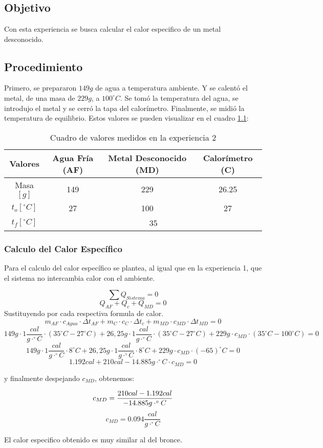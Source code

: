 \documentclass[12pt]{report}
\begin{document}
\chapter{}
\section{Objetivo}
Con esta experiencia se busca calcular el calor especifico de un metal desconocido.

\section{Procedimiento}
Primero, se prepararon $149 g$ de agua a temperatura ambiente. Y se calentó el metal, de una masa de $229 g$, a $100^\circ C$. Se tomó la temperatura del agua, se introdujo el metal y se cerró la tapa del calorímetro. Finalmente, se midió la temperatura de equilibrio.
Estos valores se pueden visualizar en el cuadro \ref{table:data}:

\begin{table}[htpb!]
\centering
\begin{tabular}{|c|c|c|c|}
    \hline
    Valores & Agua Fría (AF) & Metal Desconocido (MD)  & Calorímetro (C)\\
    \hline
    Masa$[g]$ & 149 & 229 & 26.25 \\
    \hline
    $t_o [^\circ C]$ & 27 & 100 & 27 \\
    \hline
    $t_f [^\circ C]$ & \multicolumn{3}{|c|}{35}\\
    \hline
\end{tabular}
\caption{Cuadro de valores medidos en la experiencia 2}
\label{table:data}
\end{table}

\subsection{Calculo del Calor Específico}

Para el calculo del calor específico se plantea, al igual que en la experiencia 1, que el sistema no intercambia calor con el ambiente.

$$\sum Q_{Sistema} = 0$$
$$Q_{AF} + Q_c + Q_{MD} = 0$$
\hspace{1cm} Sustituyendo por cada respectiva formula de calor.
$$m_{AF} \cdot c_{Agua} \cdot {\Delta t}_{AF} + m_C \cdot c_C \cdot {\Delta t}_c + m_{MD} \cdot c_{MD} \cdot {\Delta t}_{MD} = 0$$
$$149g \cdot 1 \frac{cal}{g\cdot^\circ C} \cdot (35^\circ C - 27^\circ C) + 26,25g \cdot 1 \frac{cal}{g\cdot^\circ C} \cdot (35^\circ C - 27^\circ C) + 229g \cdot  c_{MD} \cdot (35^\circ C - 100^\circ C) = 0$$
$$149g \cdot 1 \frac{cal}{g\cdot^\circ C} \cdot 8^\circ C + 26,25g \cdot 1 \frac{cal}{g\cdot^\circ C} \cdot 8^\circ C + 229g \cdot c_{MD}  \cdot (-65)^\circ C = 0$$
$$1.192 cal + 210 cal - 14.885 g\cdot^\circ C \cdot c_{MD}  = 0$$

\hspace{1cm} y finalmente despejando $c_{MD}$, obtenemos:

$$c_{MD}  = \frac{210 cal - 1.192 cal}{-14.885 g\cdot^\circ C}\\$$
$$c_{MD}  = 0.094 \frac{cal}{g\cdot^\circ C}$$

El calor especifico obtenido es muy similar al del bronce.
\end{document}
